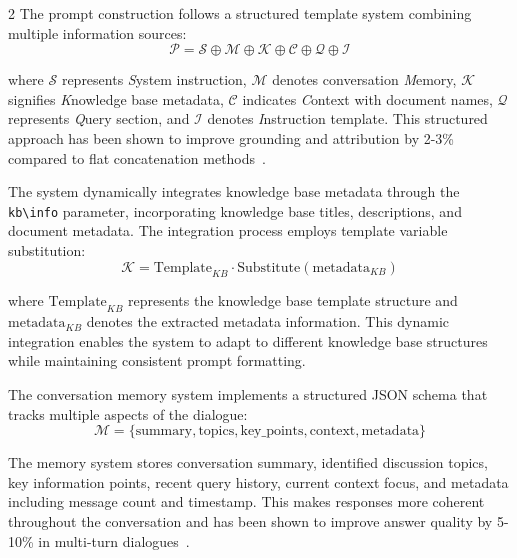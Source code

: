 \documentclass[10pt,letterpaper]{article}
\makeatletter
\let\cite\citep
\renewcommand{\subsubsection}{\@startsection{subsubsection}{3}{\z@}%
                                     {-2.25ex\@plus -0.5ex \@minus -.2ex}%
                                     {0.3ex \@plus .1ex}%
                                     {\normalfont\normalsize\itshape}}
\makeatother
\begin{document}
\begin{multicols}{2}
The prompt construction follows a structured template system combining multiple information sources:
\begin{equation}    
\mathcal{P} = \mathcal{S} \oplus \mathcal{M} \oplus \mathcal{K} \oplus \mathcal{C} \oplus \mathcal{Q} \oplus \mathcal{I}
\end{equation}

where $\mathcal{S}$ represents \textit{S}ystem instruction, $\mathcal{M}$ denotes conversation \textit{M}emory, $\mathcal{K}$ signifies \textit{K}nowledge base metadata, $\mathcal{C}$ indicates \textit{C}ontext with document names, $\mathcal{Q}$ represents \textit{Q}uery section, and $\mathcal{I}$ denotes \textit{I}nstruction template. This structured approach has been shown to improve grounding and attribution by 2-3\% compared to flat concatenation methods~\cite{gupta2024comprehensive}.


The system dynamically integrates knowledge base metadata through the \texttt{kb\textbackslash info} parameter, incorporating knowledge base titles, descriptions, and document metadata. The integration process employs template variable substitution:
\begin{equation}
\mathcal{K} = \text{Template}_{KB} \cdot \text{Substitute}(\text{metadata}_{KB})
\end{equation}

where $\text{Template}_{KB}$ represents the knowledge base template structure and $\text{metadata}_{KB}$ denotes the extracted metadata information. This dynamic integration enables the system to adapt to different knowledge base structures while maintaining consistent prompt formatting.


The conversation memory system implements a structured JSON schema that tracks multiple aspects of the dialogue:
$$\mathcal{M} = \{\text{summary}, \text{topics}, \text{key\_points}, \text{context}, \text{metadata}\}$$

The memory system stores conversation summary, identified discussion topics, key information points, recent query history, current context focus, and metadata including message count and timestamp. This makes responses more coherent throughout the conversation and has been shown to improve answer quality by 5-10\% in multi-turn dialogues~\cite{liu2023chained,wang2022selfconsistency}.


\end{multicols}
\end{document}
